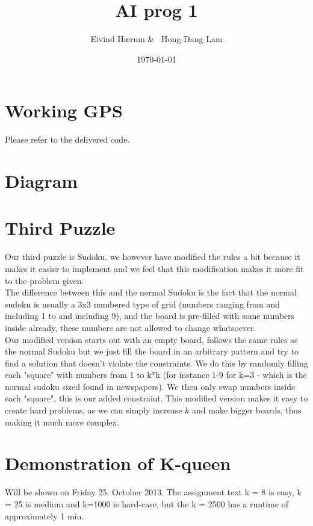 \documentclass[12pt, a4paper]{article}
\title{AI prog 1}
\author{Eivind Hærum \& \ Hong-Dang Lam}
\date{\today} %
\begin{document}
\maketitle
% 
% 
 
\newpage
\tableofcontents
\newpage
 
\section{Working GPS}
Please refer to the delivered code.

\section{Diagram}

\section{Third Puzzle}
Our third puzzle is Sudoku, we however have modified the rules a bit because it makes it easier to implement and we feel that this modification makes it more fit to the problem given.\\
The difference between this and the normal Sudoku is the fact that the normal sudoku is usually a 3x3 numbered type of grid (numbers ranging from and including 1 to and including 9), and the board is pre-filled with some numbers inside already, these numbers are not allowed to change whatsoever.\\
Our modified version starts out with an empty board, follows the same rules as the normal Sudoku but we just fill the board in an arbitrary pattern and try to find a solution that doesn't violate the constraints. We do this by randomly filling each "square" with numbers from 1 to k*k (for instance 1-9 for k=3 - which is the normal sudoku sized found in newspapers). We then only swap numbers inside each "square", this is our added constraint. This modified version makes it easy to create hard problems, as we can simply increase $k$ and make bigger boards, thus making it much more complex.

\section{Demonstration of K-queen}
Will be shown on Friday 25. October 2013.
The assignment text  k = 8 is easy, k = 25 is medium and k=1000 is hard-case, but the k = 2500 has a runtime of approximately 1 min.
\end{document}
